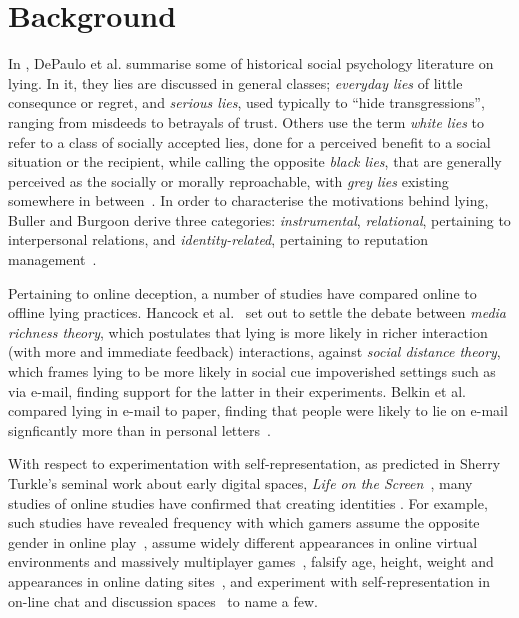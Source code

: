 \documentclass{sig-alternate}
\begin{document}
\section{Background}


In \cite{depaulo2003cues}, DePaulo et al. summarise some of historical social psychology literature on lying. In it, they lies are discussed in general classes; \emph{everyday lies} of little consequnce or regret, and \emph{serious lies}, used typically to ``hide transgressions'', ranging from misdeeds to betrayals of trust. Others use the term \emph{white lies} to refer to a class of socially accepted lies, done for a perceived benefit to a social situation or the recipient, while calling the opposite \emph{black lies}, that are generally perceived as the socially or morally reproachable, with \emph{grey lies} existing somewhere in between~\cite{camden1984white}.  In order to characterise the motivations behind lying, Buller and Burgoon derive three categories: \emph{instrumental}, \emph{relational}, pertaining to interpersonal relations, and \emph{identity-related}, pertaining to reputation management~\cite{buller1996testing}. 

Pertaining to online deception, a number of studies have compared online to offline lying practices. Hancock et al.~\cite{hancock2004deception} set out to settle the debate between \emph{media richness theory}, which postulates that lying is more likely in richer interaction (with more and immediate feedback) interactions, against \emph{social distance theory}, which frames lying to be more likely in social cue impoverished settings such as via e-mail, finding support for the latter in their experiments.  Belkin et al. compared lying in e-mail to paper, finding that people were likely to lie on e-mail signficantly more than in personal letters~\cite{naquin2010finer}.  

With respect to experimentation with self-representation, as predicted in Sherry Turkle's seminal work about early digital spaces, \emph{Life on the Screen}~\cite{turkle2011life}, many studies of online studies have confirmed that creating identities .  For example, such studies have revealed frequency with which gamers assume the opposite gender in online play~\cite{hussain2008gender,potts2014love,van2008theorizing}, assume widely different appearances in online virtual environments and massively multiplayer games~\cite{yee2009proteus}, falsify age, height, weight and appearances in online dating sites~\cite{Hancock:2007:TLO:1240624.1240697,JCC4:JCC420}, and experiment with self-representation in on-line chat and discussion spaces~\cite{donath1999identity,whitty2002liar,whitty2001age} to name a few.
\end{document}

